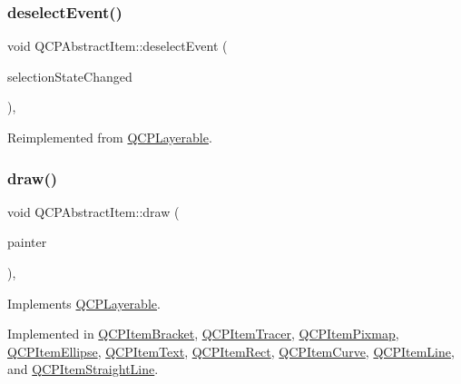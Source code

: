\mbox{\label{class_q_c_p_abstract_item_af9093798cb07a861dcc73f93ca16c0c1}} 
\subsubsection{\texorpdfstring{deselectEvent()}{deselectEvent()}}
{\footnotesize\ttfamily void Q\+C\+P\+Abstract\+Item\+::deselect\+Event (\begin{DoxyParamCaption}\item[{bool $\ast$}]{selection\+State\+Changed }\end{DoxyParamCaption})\hspace{0.3cm}{\ttfamily [protected]}, {\ttfamily [virtual]}}



Reimplemented from \mbox{\hyperlink{class_q_c_p_layerable_ae546370644a5551c76af739afc008bee}{Q\+C\+P\+Layerable}}.

\mbox{\label{class_q_c_p_abstract_item_a007fdab79c935a5da5aa04a21d268c18}} 
\subsubsection{\texorpdfstring{draw()}{draw()}}
{\footnotesize\ttfamily void Q\+C\+P\+Abstract\+Item\+::draw (\begin{DoxyParamCaption}\item[{\mbox{\hyperlink{class_q_c_p_painter}{Q\+C\+P\+Painter}} $\ast$}]{painter }\end{DoxyParamCaption})\hspace{0.3cm}{\ttfamily [protected]}, {}}



Implements \mbox{\hyperlink{class_q_c_p_layerable_aecf2f7087482d4b6a78cb2770e5ed12d}{Q\+C\+P\+Layerable}}.



Implemented in \mbox{\hyperlink{class_q_c_p_item_bracket_a942a3978aea44a2fc7b4383f2bf6d417}{Q\+C\+P\+Item\+Bracket}}, \mbox{\hyperlink{class_q_c_p_item_tracer_a11f187ffea436434f3b5cfc387811967}{Q\+C\+P\+Item\+Tracer}}, \mbox{\hyperlink{class_q_c_p_item_pixmap_a9538a7d37fe20a4ff4bb2cb5bbbf2b48}{Q\+C\+P\+Item\+Pixmap}}, \mbox{\hyperlink{class_q_c_p_item_ellipse_a77eebd67a402fc496082a2e51356928c}{Q\+C\+P\+Item\+Ellipse}}, \mbox{\hyperlink{class_q_c_p_item_text_a8f8f075da83b6547c2b32e1f64cf0554}{Q\+C\+P\+Item\+Text}}, \mbox{\hyperlink{class_q_c_p_item_rect_a3c492960d0fc038cf1b60578b62b6cdc}{Q\+C\+P\+Item\+Rect}}, \mbox{\hyperlink{class_q_c_p_item_curve_a856ae61de18278847ba5e0e357bf68f2}{Q\+C\+P\+Item\+Curve}}, \mbox{\hyperlink{class_q_c_p_item_line_ae184140b61b2ef5b8edde76304447200}{Q\+C\+P\+Item\+Line}}, and \mbox{\hyperlink{class_q_c_p_item_straight_line_acbc84ad219bf4845152e4e2202fcaa3c}{Q\+C\+P\+Item\+Straight\+Line}}.

